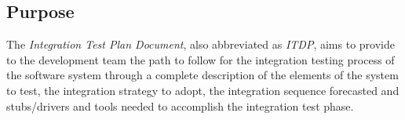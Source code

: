 \subsection{Purpose}

The \textit{Integration Test Plan Document}, also abbreviated as \textit{ITDP}, aims to provide to the development team the path to follow for the integration testing process of the software system through a complete description of the elements of the system to test, the integration strategy to adopt, the integration sequence forecasted and stubs/drivers and tools needed to accomplish the integration test phase.

